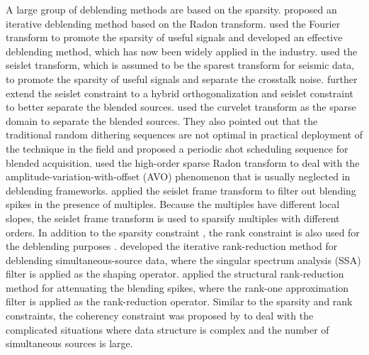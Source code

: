 A large group of deblending methods are based on the sparsity. \cite{akerberg2008} proposed an iterative deblending method based on the Radon transform. \cite{abma2009} used the Fourier transform to promote the sparsity of useful signals and developed an effective deblending method, which has now been widely applied in the industry. \cite{yangkang20142} used the seislet transform, which is assumed to be the sparest transform for seismic data, to promote the sparsity of useful signals and separate the crosstalk noise. \cite{yangkang2015dbortho} further extend the seislet constraint to a hybrid orthogonalization and seislet constraint to better separate the blended sources. \cite{shaohuan20161} used the curvelet transform as the sparse domain to separate the blended sources. They also pointed out that the traditional random dithering sequences are not optimal in practical deployment of the technique in the field and proposed a periodic shot scheduling sequence for blended acquisition. \cite{yaru20172} used the high-order sparse Radon transform to deal with the amplitude-variation-with-offset (AVO) phenomenon that is usually neglected in deblending frameworks. \cite{yatong2018seis} applied the seislet frame transform to filter out blending spikes in the presence of multiples. Because the multiples have different local slopes, the seislet frame transform is used to sparsify multiples with different orders. In addition to the sparsity constraint \cite[]{mostafa2016geo,mostafa2016bssa}, the rank constraint is also used for the deblending purposes \cite[]{yaru2016dblend,zhangdong2016cseg,zhangdong2016seg,zhangdong2016eage,wujuan2018jge3,baimin2019jag}. \cite{jinkun2015} developed the iterative rank-reduction method for deblending simultaneous-source data, where the singular spectrum analysis (SSA) filter is applied as the shaping operator. \cite{yatong2017ieee} applied the structural rank-reduction method for attenuating the blending spikes, where the rank-one approximation filter is applied as the rank-reduction operator. Similar to the sparsity and rank constraints, the coherency constraint was proposed by \cite{shaohuan2017gji} to deal with the complicated situations where data structure is complex and the number of simultaneous sources is large.


